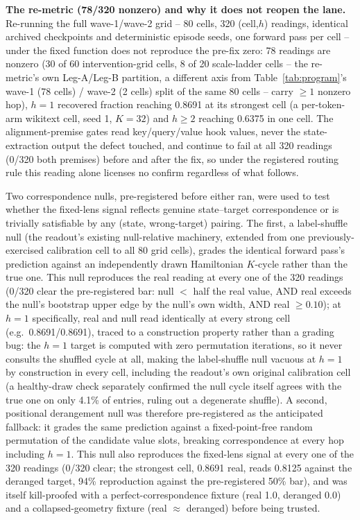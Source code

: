 \documentclass{article} %
\begin{document}
\textbf{The re-metric (78/320 nonzero) and why it does not reopen the
lane.} Re-running the full wave-1/wave-2 grid -- 80 cells, 320 (cell,$h$)
readings, identical archived checkpoints and deterministic episode seeds,
one forward pass per cell -- under the fixed function does not reproduce
the pre-fix zero: 78 readings are nonzero (30 of 60 intervention-grid
cells, 8 of 20 scale-ladder cells -- the re-metric's own Leg-A/Leg-B
partition, a different axis from Table~\ref{tab:program}'s wave-1 (78
cells) / wave-2 (2 cells) split of the same 80 cells -- carry $\geq 1$
nonzero hop), $h{=}1$ recovered fraction
reaching 0.8691 at its strongest cell (a per-token-arm wikitext cell,
seed 1, $K{=}32$) and $h{\geq}2$ reaching 0.6375 in one cell. The
alignment-premise gates read key/query/value hook values, never the
state-extraction output the defect touched, and continue to fail at all
320 readings (0/320 both premises) before and after the fix, so under the
registered routing rule this reading alone licenses no confirm regardless
of what follows. %

Two correspondence nulls, pre-registered before either ran, were used to
test whether the fixed-lens signal reflects genuine state--target
correspondence or is trivially satisfiable by any (state, wrong-target)
pairing. The first, a label-shuffle null (the readout's existing
null-relative machinery, extended from one previously-exercised
calibration cell to all 80 grid cells), grades the identical forward
pass's prediction against an independently drawn Hamiltonian $K$-cycle
rather than the true one. This null reproduces the real reading at every
one of the 320 readings (0/320 clear the pre-registered bar: null $<$ half
the real value, AND real exceeds the null's bootstrap upper edge by the
null's own width, AND real $\geq 0.10$); at $h{=}1$ specifically, real and
null read identically at every strong cell (e.g.\ 0.8691/0.8691), traced to
a construction property rather than a grading bug: the $h{=}1$ target is
computed with zero permutation iterations, so it never consults the
shuffled cycle at all, making the label-shuffle null vacuous at $h{=}1$ by
construction in every cell, including the readout's own original
calibration cell (a healthy-draw check separately confirmed the null cycle
itself agrees with the true one on only 4.1\% of entries, ruling out a
degenerate shuffle). A second, positional derangement null was therefore
pre-registered as the anticipated fallback: it grades the same prediction
against a fixed-point-free random permutation of the candidate value
slots, breaking correspondence at every hop including $h{=}1$. This null
also reproduces the fixed-lens signal at every one of the 320 readings
(0/320 clear; the strongest cell, 0.8691 real, reads 0.8125 against the
deranged target, 94\% reproduction against the pre-registered 50\% bar),
and was itself kill-proofed with a perfect-correspondence fixture
(real 1.0, deranged 0.0) and a collapsed-geometry fixture
(real $\approx$ deranged) before being trusted.
\end{document}
